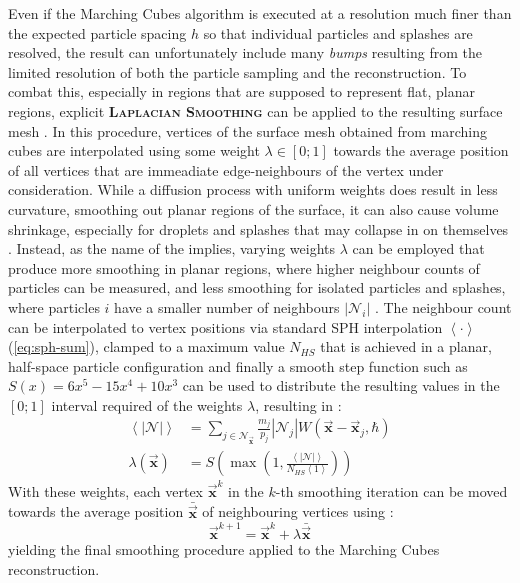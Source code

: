 \documentclass[oneside, a4paper]{book}
\newcommand\emphasis[1]{{\scshape\bfseries#1}}
\newcommand\abs[1]{\left|#1\right|}
\newcommand\angled[1]{\left\langle#1\right\rangle}
\newcommand\vek[1]{\vec{\bm{#1}}}
\newcommand\br[1]{\left(#1\right)}
\begin{document}
  Even if the Marching Cubes algorithm is executed at a resolution much finer than the expected particle spacing $h$ so that individual particles and splashes are resolved, the result can unfortunately include many \textit{bumps} resulting from the limited resolution of both the particle sampling and the reconstruction. To combat this, especially in regions that are supposed to represent flat, planar regions, explicit \emphasis{Laplacian Smoothing} can be applied to the resulting surface mesh \autocite{laplacian-surf-reconst}. In this procedure, vertices of the surface mesh obtained from marching cubes are interpolated using some weight $\lambda\in[0;1]$ towards the average position of all vertices that are immeadiate edge-neighbours of the vertex under consideration. While a diffusion process with uniform weights does result in less curvature, smoothing out planar regions of the surface, it can also cause volume shrinkage, especially for droplets and splashes that may collapse in on themselves \autocite{laplacian-surf-reconst}. Instead, as the name of the \autocite[Weighted Laplacian Smoothing]{laplacian-surf-reconst} implies, varying weights $\lambda$ can be employed that produce more smoothing in planar regions, where higher neighbour counts of particles can be measured, and less smoothing for isolated particles and splashes, where particles $i$ have a smaller number of neighbours $\abs{\mathcal{N}_{i}}$ \autocite{laplacian-surf-reconst}. The neighbour count can be interpolated to vertex positions via standard SPH interpolation $\angled{\cdot}$ (\autoref{eq:sph-sum}), clamped to a maximum value $N_{HS}$ that is achieved in a planar, half-space particle configuration and finally a smooth step function such as $S(x)=6x^5-15x^4+10x^3$ can be used to distribute the resulting values in the $[0;1]$ interval required of the weights $\lambda$, resulting in \autocite{laplacian-surf-reconst}:
  \begin{align}
    \angled{\abs{\mathcal{N}}} &= \sum_{j\in\mathcal{N}_{\vek{x}}} \frac{m_j}{p_j} \abs{\mathcal{N}_j} W\br{\vek{x}-\vek{x}_j, \hbar}\\
    \lambda\br{\vek{x}} &= S\br{\max\br{1, \frac{\angled{\abs{\mathcal{N}}}}{N_{HS}\angled{1}}}}
  \end{align}
  With these weights, each vertex $\vek{x}^k$ in the $k$-th smoothing iteration can be moved towards the average position $\bar{\vek{x}}$ of neighbouring vertices using \autocite{laplacian-surf-reconst}:
  \begin{equation}
    \vek{x}^{k+1} = \vek{x}^{k} + \lambda \bar{\vek{x}}
  \end{equation}
  yielding the final smoothing procedure applied to the Marching Cubes reconstruction.
\end{document}
